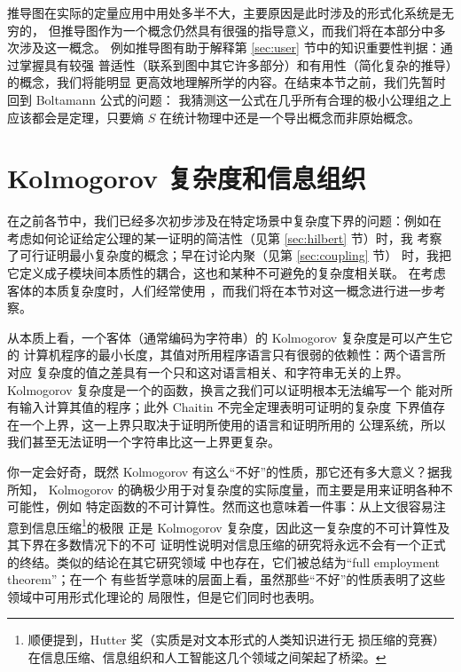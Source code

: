 推导图在实际的定量应用中用处多半不大，主要原因是此时涉及的形式化系统是无穷的，
但推导图作为一个概念仍然具有很强的指导意义，而我们将在本部分中多次涉及这一概念。
例如推导图有助于解释第 \ref{sec:user} 节中的知识重要性判据：通过掌握具有较强
普适性（联系到图中其它许多部分）和有用性（简化复杂的推导）的概念，我们将能明显
更高效地理解所学的内容。在结束本节之前，我们先暂时回到 Boltamann 公式的问题：
我猜测这一公式在几乎所有合理的极小公理组之上应该都会是定理，只要熵 $S$
在统计物理中还是一个导出概念而非原始概念。

\section{Kolmogorov 复杂度和信息组织}\label{sec:kolmogorov}

在之前各节中，我们已经多次初步涉及在特定场景中复杂度下界的问题：例如在
考虑如何论证给定公理的某一证明的简洁性（见第 \ref{sec:hilbert} 节）时，我
考察了可行证明最小复杂度的概念；早在讨论内聚（见第 \ref{sec:coupling} 节）
时，我把它定义成子模块间本质性的耦合，这也和某种不可避免的复杂度相关联。
在考虑客体的本质复杂度时，人们经常使用 %
，而我们将在本节对这一概念进行进一步考察。

从本质上看，一个客体（通常编码为字符串）的 Kolmogorov 复杂度是可以产生它的
计算机程序的最小长度，其值对所用程序语言只有很弱的依赖性：两个语言所对应
复杂度的值之差具有一个只和这对语言相关、和字符串无关的上界。Kolmogorov
复杂度是一个的函数，换言之我们可以证明根本无法编写一个
能对所有输入计算其值的程序；此外 Chaitin 不完全定理表明可证明的复杂度
下界值存在一个上界，这一上界只取决于证明所使用的语言和证明所用的
公理系统，所以我们甚至无法证明一个字符串比这一上界更复杂。

你一定会好奇，既然 Kolmogorov 有这么“不好”的性质，那它还有多大意义？据我所知，%
Kolmogorov 的确极少用于对复杂度的实际度量，而主要是用来证明各种不可能性，例如
特定函数的不可计算性。然而这也意味着一件事：从上文很容易注意到信息压缩\footnote%
{顺便提到，Hutter 奖（实质是对文本形式的人类知识进行无
损压缩的竞赛）在信息压缩、信息组织和人工智能这几个领域之间架起了桥梁。}的极限
正是 Kolmogorov 复杂度，因此这一复杂度的不可计算性及其下界在多数情况下的不可
证明性说明对信息压缩的研究将永远不会有一个正式的终结。类似的结论在其它研究领域
中也存在，它们被总结为“full employment theorem”；在一个
有些哲学意味的层面上看，虽然那些“不好”的性质表明了这些领域中可用形式化理论的
局限性，但是它们同时也表明。

